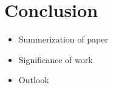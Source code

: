 \chapter{Conclusion \label{Chapter-Conclusion}}

\begin{itemize}
    \item Summerization of paper
    \item Significance of work
    \item Outlook
\end{itemize}